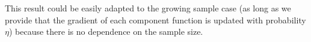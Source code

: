 \documentclass[11pt]{article}
\begin{document}
% 
% 
% 
% 
% 



\bigskip\bigskip

\noindent
This result could be easily adapted to the growing sample case (as long as we provide that the gradient of each component function is updated with probability $\eta$) because there is no dependence on the sample size.
\end{document}
